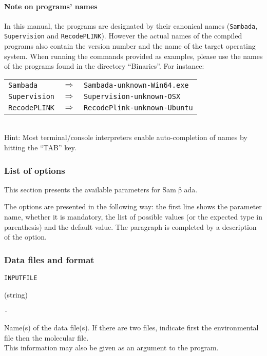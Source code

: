 \documentclass[a4paper,11pt]{article}
\newcommand{\versionnum}{unknown}
\newcommand{\smb}{\textsf{Sam$\upbeta$ada}}
\newcommand{\prog}[1]{\texttt{#1}}
\newcommand\textline[6][t]{%
\par\smallskip\noindent\parbox[#1]
{2.5cm}{\raggedright
\texttt{\large #2}}%
\parbox[#1]{\dimexpr .5\textwidth - 2.5cm}
{\ifthenelse{\equal{#3}{M}}{Mandatory}{Optional}}
\parbox[#1]{.25\textwidth}
{\centering#4}%
\parbox[#1]{.25\textwidth}
{\raggedleft\texttt{#5}}
\par\smallskip\noindent\hspace{\dimexpr 2.5cm }
\begin{minipage}{\dimexpr\textwidth - 2.5cm }
#6
\end{minipage}%
\bigskip
}
\begin{document}
\paragraph{Note on programs' names} 
In this manual, the programs are designated by their canonical names (\prog{Sambada}, \prog{Supervision} and \prog{RecodePLINK}).
However the actual names of the compiled programs also contain the version number and the name of the target operating system.
When running the commands provided as examples, please use the names of the programs found in the directory \enquote{Binaries}.
For instance: \\
\begin{tabular}{lll}
\prog{Sambada}		& $\Rightarrow$ & \prog{Sambada-\versionnum-Win64.exe}	\\
\prog{Supervision}		& $\Rightarrow$ & \prog{Supervision-\versionnum-OSX}		\\
\prog{RecodePLINK}	& $\Rightarrow$ & \prog{RecodePlink-\versionnum-Ubuntu}	 \\
\end{tabular} \\
Hint: Most terminal/console interpreters enable auto-completion of names by hitting the \enquote{TAB} key.

\subsubsection{List of options\label{seq:liste-options}}

This section presents the available parameters for \smb.



The options are presented in the following way: the first line shows the parameter
name, whether it is mandatory, the list of possible values (or the
expected type in parenthesis) and the default value.
The paragraph is completed by a description of the option.

\subsubsection*{Data files and format}
\textline{INPUTFILE}{O}{(string)}{-}
{Name(s) of the data file(s). If there are two files, indicate first the environmental file then the molecular file.\\ This information may also be given as an argument to the program.}
\end{document}
